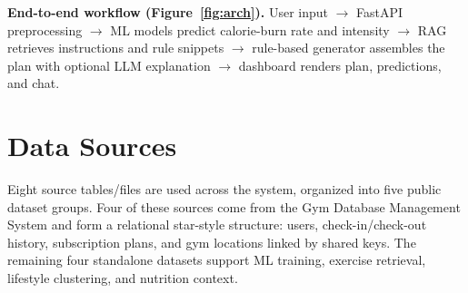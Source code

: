 \documentclass[11pt,a4paper]{article}
\begin{document}
\textbf{End-to-end workflow (Figure~\ref{fig:arch}).} User input $\rightarrow$ FastAPI preprocessing $\rightarrow$ ML models predict calorie-burn rate and intensity $\rightarrow$ RAG retrieves instructions and rule snippets $\rightarrow$ rule-based generator assembles the plan with optional LLM explanation $\rightarrow$ dashboard renders plan, predictions, and chat.

\section{Data Sources}
Eight source tables/files are used across the system, organized into five public dataset groups. Four of these sources come from the Gym Database Management System and form a relational star-style structure: users, check-in/check-out history, subscription plans, and gym locations linked by shared keys. The remaining four standalone datasets support ML training, exercise retrieval, lifestyle clustering, and nutrition context.
\end{document}

